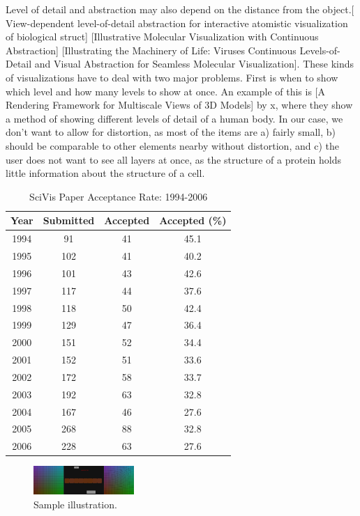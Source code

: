 \documentclass[journal]{vgtc}                %
\begin{document}
Level of detail and abstraction may also depend on the distance from the object.[ View-dependent level-of-detail abstraction for interactive atomistic visualization of biological struct] [Illustrative Molecular Visualization with Continuous Abstraction] [Illustrating the Machinery of Life: Viruses Continuous Levels-of-Detail and Visual Abstraction for Seamless Molecular Visualization]. 
These kinds of visualizations have to deal with two major problems. First is when to show which level and how many levels to show at once. An example of this is [A Rendering Framework for Multiscale Views of 3D Models] by x, where they show a method of showing different levels of detail of a human body. In our case, we don’t want to allow for distortion, as most of the items are a) fairly small, b) should be comparable to other elements nearby without distortion, and c) the user does not want to see all layers at once, as the structure of a protein holds little information about the structure of a cell.


\begin{table}
 \caption{SciVis Paper Acceptance Rate: 1994-2006}
 \label{vis_accept}
 \scriptsize
 \begin{center}
   \begin{tabular}{cccc}
     Year & Submitted & Accepted & Accepted (\%)\\
   \hline
     1994 &  91 & 41 & 45.1\\
     1995 & 102 & 41 & 40.2\\
     1996 & 101 & 43 & 42.6\\
     1997 & 117 & 44 & 37.6\\
     1998 & 118 & 50 & 42.4\\
     1999 & 129 & 47 & 36.4\\
     2000 & 151 & 52 & 34.4\\
     2001 & 152 & 51 & 33.6\\
     2002 & 172 & 58 & 33.7\\
     2003 & 192 & 63 & 32.8\\
     2004 & 167 & 46 & 27.6\\
     2005 & 268 & 88 & 32.8\\
     2006 & 228 & 63 & 27.6
   \end{tabular}
 \end{center}
\end{table}

\begin{figure}[htb]
 \centering
 \includegraphics[width=1.5in]{Picture1}
 \caption{Sample illustration.}
\end{figure}
\end{document}
